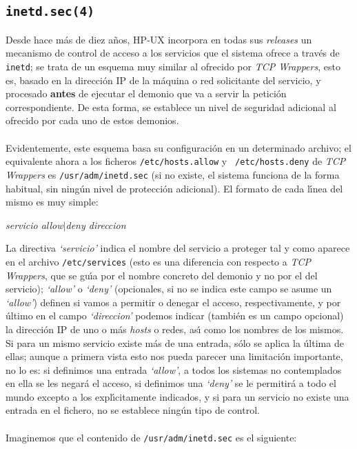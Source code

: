 \subsection{\tt inetd.sec(4)}
Desde hace m\'as de diez a\~nos, HP-UX incorpora en todas sus {\it releases} 
un mecanismo de control de acceso a los servicios que el sistema ofrece a 
trav\'es de {\tt inetd}; se trata de un esquema muy similar al ofrecido por {\it
TCP Wrappers}, esto es, basado en la direcci\'on IP de la m\'aquina o red 
solicitante del servicio, y procesado {\bf antes} de ejecutar el demonio que
va a servir la petici\'on correspondiente. De esta forma, se establece un nivel
de seguridad adicional al ofrecido por cada uno de estos demonios.\\
\\Evidentemente, este esquema basa su configuraci\'on en un determinado archivo;
el equivalente ahora a los ficheros {\tt /etc/hosts.allow} y {\tt 
/etc/hosts.deny} de {\it TCP Wrappers} es {\tt /usr/adm/inetd.sec} (si no 
existe, el sistema funciona de la forma habitual, sin ning\'un nivel de 
protecci\'on adicional). El formato de cada l\'{\i}nea del mismo es muy simple:
\begin{center}
{\it servicio allow$\mid$deny direccion}
\end{center}
La directiva {\it `servicio'} indica el nombre del servicio a proteger tal y 
como aparece en el archivo {\tt /etc/services} (esto es una diferencia con 
respecto a {\it TCP
Wrappers}, que se gu\'{\i}a por el nombre concreto del demonio y no por el del
servicio); {\it `allow'} o {\it `deny'} (opcionales, si no se indica este campo
se asume un {\it `allow'}) definen si vamos a permitir o denegar 
el acceso, respectivamente, y por \'ultimo en el campo {\it `direccion'} podemos
indicar (tambi\'en es un campo opcional) la direcci\'on IP de uno o m\'as {\it 
hosts} o redes, as\'{\i} como los
nombres de los mismos. Si para un mismo servicio existe m\'as de una entrada,
s\'olo se aplica la \'ultima de ellas; aunque a primera vista esto nos pueda 
parecer una limitaci\'on importante, no lo es: si definimos una entrada {\it
`allow'}, a todos los sistemas no contemplados en ella se les negar\'a el 
acceso, si definimos una {\it `deny'} se le permitir\'a a todo el mundo excepto 
a los expl\'{\i}citamente indicados, y si para un servicio no existe una entrada
en el fichero, no se establece ning\'un tipo de control.\\
\\Imaginemos que el contenido de {\tt /usr/adm/inetd.sec} es el siguiente:
